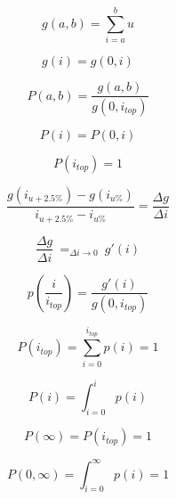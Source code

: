 \begin{equation} \label{eq:units_group}
	g(a,b)=\sum_{i=a}^{b} u
\end{equation}

\begin{equation} \label{eq:group}
	g(i)=g(0,i)
\end{equation}

\begin{equation} \label{eq:units_group_propability}
	P(a,b)=\frac{g(a,b)}{g(0,i_{top})}
\end{equation}

\begin{equation} \label{eq:group_propability}
	P(i)=P(0,i)
\end{equation}

\begin{equation} \label{eq:overall_propability}
	P(i_{top})=1
\end{equation}

\begin{equation} \label{eq:delta_g_delta_i}
	\frac {g(i_{u+2.5\%})-g(i_{u\%})}{i_{u+2.5\%}-i_{u\%}}
	=\frac{\Delta g}{\Delta i}
\end{equation}

\begin{equation} \label{eq:group_density}
	\frac{\Delta g}{\Delta i}~
	=_{\Delta i \rightarrow 0}
	~ g'(i)
\end{equation}

\begin{equation} \label{eq:propability_density}
	p(\frac{i}{i_{top}})=\frac{g'(i)}{g(0,i_{top})}
\end{equation}

\begin{equation} \label{eq:propability_distribution}
	P(i_{top})=\sum_{i=0}^{i_{top}} p(i)=1
\end{equation}

\begin{equation} \label{eq:propability}
	P(i)=\int_{i=0}^i p(i)
\end{equation}

\begin{equation} \label{eq:propability_overall}
	P(\infty)= P(i_{top})= 1
\end{equation}

\begin{equation} \label{eq:propability_overall_infty}
	P(0,\infty)=\int_{i=0}^{\infty} p(i)=1
\end{equation}

